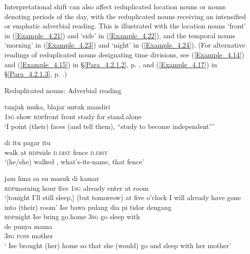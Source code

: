 Interpretational shift can also affect reduplicated location nouns or nouns denoting periods of the day, with the reduplicated nouns receiving an intensified or emphatic adverbial reading. This is illustrated with the location nouns  ‘front’ in (\ref{Example_4.21}) and  ‘side’ in (\ref{Example_4.22}), and the temporal nouns  ‘morning’ in (\ref{Example_4.23}) and  ‘night’ in (\ref{Example_4.24}). (For alternative readings of reduplicated nouns designating time divisions, see (\ref{Example_4.14}) and (\ref{Example_4.15}) in §\ref{Para_4.2.1.2}, p. \pageref{Example_4.14}, and (\ref{Example_4.17}) in §\ref{Para_4.2.1.3}, p. \pageref{Example_4.17}.)
 
\begin{styleExampleTitle}
Reduplicated nouns: Adverbial reading
\end{styleExampleTitle}

\ea
\label{Example_4.21}
 {tunjuk} {} {muka}, {blajar} {untuk} {mandiri}\\ %
 \textsc{1sg}  show  \textsc{rdp}{\Tilde}front  front  study  for  stand.alone\\
\glt 
‘I point  (their) faces (and tell them), ``study to become independent''' \textstyleExampleSource{[081115-001a-Cv.0054]}
\z

\ea
\label{Example_4.22}
 {di} {} {itu} {pagar} {itu}\\ %
 walk  at  \textsc{rdp}{\Tilde}side  \textsc{d.dist}  fence  \textsc{d.dist}\\
\glt 
‘(he/she) walked , what’s-its-name, that fence’ \textstyleExampleSource{[081025-006-Cv.0094]}
\z

\ea
\label{Example_4.23}
\gll {\ldots} {} {jam} {lima} {sa} {su} {masuk} {di} {kamar}\\ %
  { }  \textsc{rdp}{\Tilde}morning  hour  five  \textsc{1sg}  already  enter  at  room\\
 ‘[tonight I’ll still sleep,] (but tomorrow)  at five o’clock I will already have gone into (their) room’ \textstyleExampleSource{[081115-001a-Cv.0325]}
\z
\ea
\label{Example_4.24}
 {Ise} {bawa} {pulang} {dia} {pi} {tidor} {dengang}\\ %
 {\textsc{rdp}{\Tilde}night}  Ise  bring  go.home  \textsc{3sg}  go  sleep  with\\
 \gll  de  punya  {mama}\\
 \textsc{3sg}  \textsc{poss}  {mother}\\
 ‘ Ise brought (her) home so that she (would) go and sleep with her mother’ \textstyleExampleSource{[081006-025-CvEx.0007]}

